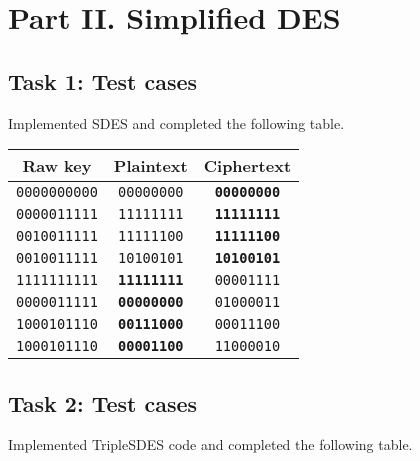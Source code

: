 \documentclass[a4paper,english,12pt]{article}
\begin{document}
\section{Part II. Simplified DES}

\subsection{Task 1: Test cases}

Implemented SDES\cite{stallings2006cryptography} and completed the following
table.

\begin{table}[H]
  \centering
  \begin{tabular}{ccc}
    \hline \textbf{Raw key} &
           \textbf{Plaintext} &
           \textbf{Ciphertext} \\
    \hline
    \texttt{0000000000} & \texttt{00000000} & \texttt{\textbf{00000000}} \\
    \texttt{0000011111} & \texttt{11111111} & \texttt{\textbf{11111111}} \\
    \texttt{0010011111} & \texttt{11111100} & \texttt{\textbf{11111100}} \\
    \texttt{0010011111} & \texttt{10100101} & \texttt{\textbf{10100101}} \\
    \texttt{1111111111} & \texttt{\textbf{11111111}} & \texttt{00001111} \\
    \texttt{0000011111} & \texttt{\textbf{00000000}} & \texttt{01000011} \\
    \texttt{1000101110} & \texttt{\textbf{00111000}} & \texttt{00011100} \\
    \texttt{1000101110} & \texttt{\textbf{00001100}} & \texttt{11000010} \\
    \hline
  \end{tabular}
  \label{table:task1}
\end{table}

\subsection{Task 2: Test cases}

Implemented TripleSDES code and completed the following table.
\end{document}
